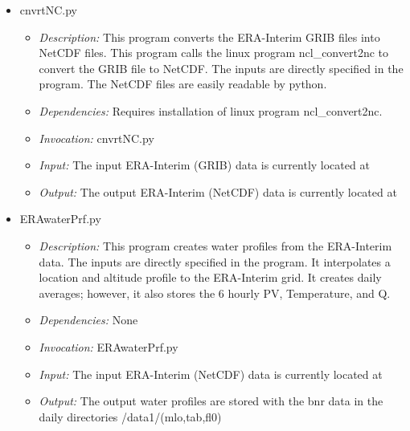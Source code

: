 \documentclass[12pt, letterpaper]{article}
\begin{document}
\begin{itemize}
\item cnvrtNC.py
\begin{itemize}
\item \textit{Description:} This program converts the ERA-Interim GRIB files into NetCDF files. This program calls the linux program ncl\_convert2nc to convert the GRIB file to NetCDF. The inputs are directly specified in the program. The NetCDF files are easily readable by python.
\item \textit{Dependencies:} Requires installation of linux program ncl\_convert2nc.
\item \textit{Invocation:} cnvrtNC.py
\item \textit{Input:} The input ERA-Interim (GRIB) data is currently located at 
\item \textit{Output:} The output ERA-Interim (NetCDF) data is currently located at 
\end{itemize}
\end{itemize}

\begin{itemize}
\item ERAwaterPrf.py
\begin{itemize}
\item \textit{Description:} This program creates water profiles from the ERA-Interim data. The inputs are directly specified in the program. It interpolates a location and altitude profile to the ERA-Interim grid. It creates daily averages; however, it also stores the 6 hourly PV, Temperature, and Q.
\item \textit{Dependencies:} None
\item \textit{Invocation:} ERAwaterPrf.py
\item \textit{Input:} The input ERA-Interim (NetCDF) data is currently located at 
\item \textit{Output:} The output water profiles are stored with the bnr data in the daily directories /data1/(mlo,tab,fl0)
\end{itemize}
\end{itemize}
\end{document}
